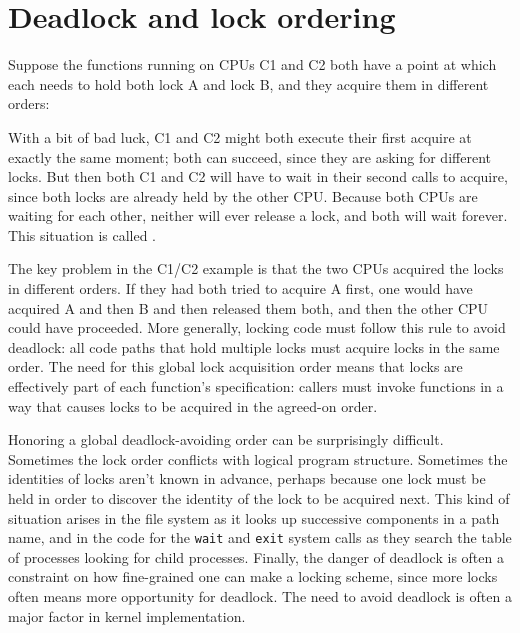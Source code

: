 \newpage
\section{Deadlock and lock ordering}

Suppose the functions running on CPUs C1 and C2 both have a point at
which each needs to hold both lock A and lock B, and they acquire them
in different orders:

\begin{center}
  
\end{center}

With a bit of bad luck, C1 and C2 might both execute their first
acquire at exactly the same moment; both can succeed, since they are
asking for different locks. But then both C1 and C2 will have to wait
in their second calls to acquire, since both locks are already
held by the other CPU. Because both CPUs are waiting for each
other, neither will ever release a lock, and both will wait forever.
This situation is called .

The key problem in the C1/C2 example is that the two CPUs acquired
the locks in different orders. If they had both tried to acquire A
first, one would have acquired A and then B and then released them both,
and then the other CPU could have proceeded. More generally,
locking code must follow this rule to avoid deadlock: all code paths
that hold multiple locks must acquire locks in the same order. The
need for this global lock acquisition order means that locks are
effectively part of each function's specification: callers must invoke
functions in a way that causes locks to be acquired in the agreed-on
order.

Honoring a global deadlock-avoiding order can be surprisingly
difficult. Sometimes the lock order conflicts with logical program
structure. Sometimes the identities of locks aren't known in advance,
perhaps because one lock must be held in order to discover the identity
of the lock to be acquired next. This kind of situation arises in the
file system as it looks up successive components in a path name, and
in the code for the {\tt wait} and {\tt exit} system calls
as they search the table of
processes looking for child processes. Finally, the danger of deadlock
is often a constraint on how fine-grained one can make a locking
scheme, since more locks often means more opportunity for deadlock.
The need to avoid deadlock is often a major factor in kernel
implementation.

